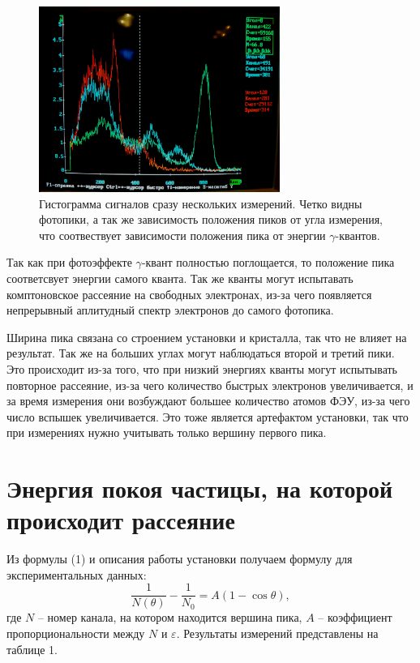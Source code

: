 \documentclass[a4paper, 14pt]{extarticle}%
\newcommand\ECaption[1]{%
     \captionsetup{font=footnotesize}%
     \caption{#1}}
\begin{document}
\begin{figure}[h]
\begin{center}
\includegraphics[width=0.7\textwidth]{gys}
\end{center}
\ECaption{Гистограмма сигналов сразу нескольких измерений. Четко видны фотопики, а так же зависимость положения пиков от угла измерения, что соотвествует зависимости положения пика от энергии $\gamma$-квантов. }
\end{figure}

Так как при фотоэффекте $\gamma$-квант полностью поглощается, то положение пика соответсвует энергии самого кванта. Так же кванты могут испытавать комптоновское рассеяние на свободных электронах, из-за чего появляется непрерывный аплитудный спектр электронов до самого фотопика.

Ширина пика связана со строением установки и кристалла, так что не влияет на результат. Так же на больших углах могут наблюдаться второй и третий пики. Это происходит из-за того, что при низкий энергиях кванты могут испытывать повторное рассеяние, из-за чего количество быстрых электронов увеличивается, и за время измерения они возбуждают большее количество атомов ФЭУ, из-за чего число вспышек увеличивается. Это тоже является артефактом установки, так что при измерениях нужно учитывать только вершину первого пика.

\section*{Энергия покоя частицы, на которой происходит рассеяние}

Из формулы (1) и описания работы установки получаем формулу для экспериментальных данных:
\begin{equation}
\frac{1}{N(\theta)} - \frac{1}{N_0} = A(1-\cos\theta),
\end{equation}
где $N$ -- номер канала, на котором находится вершина пика, $A$ -- коэффициент пропорциональности между $N$ и $\varepsilon$. Результаты измерений представлены на таблице 1.
\end{document}
